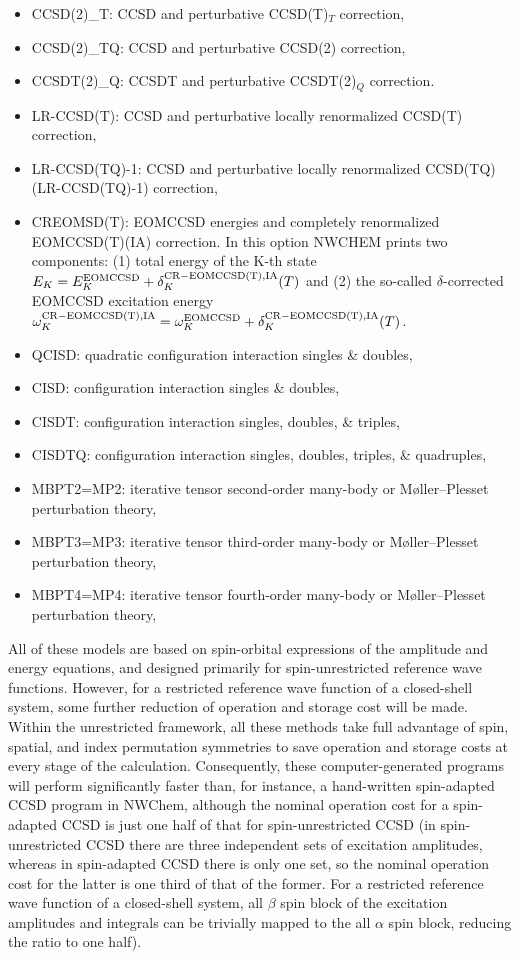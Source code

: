 \begin{itemize}
\item CCSD(2)\_T: CCSD and perturbative CCSD(T)$_T$ correction,
\item CCSD(2)\_TQ: CCSD and  perturbative CCSD(2) correction,
\item CCSDT(2)\_Q: CCSDT and perturbative CCSDT(2)$_Q$ correction.
\item LR-CCSD(T): CCSD and perturbative locally renormalized CCSD(T) correction,
\item LR-CCSD(TQ)-1: CCSD and perturbative locally renormalized CCSD(TQ) (LR-CCSD(TQ)-1) correction,
\item CREOMSD(T): EOMCCSD energies and completely renormalized EOMCCSD(T)(IA) correction.
In this option NWCHEM prints two components: (1) total energy of the K-th state 
$E_K=E_K^{\rm EOMCCSD}+\delta_K^{\rm CR-EOMCCSD(T),IA}(T)$ and (2)
the so-called $\delta$-corrected EOMCCSD excitation energy
$\omega_K^{\rm CR-EOMCCSD(T),IA}=\omega_K^{\rm EOMCCSD}+\delta_K^{\rm CR-EOMCCSD(T),IA}(T)$.
\item QCISD: quadratic configuration interaction singles \& doubles,
\item CISD: configuration interaction singles \& doubles,
\item CISDT: configuration interaction singles, doubles, \& triples,
\item CISDTQ: configuration interaction singles, doubles, triples, \& quadruples,
\item MBPT2=MP2: iterative tensor second-order many-body or M\o ller--Plesset perturbation theory,
\item MBPT3=MP3: iterative tensor third-order many-body or M\o ller--Plesset perturbation theory,
\item MBPT4=MP4: iterative tensor fourth-order many-body or M\o ller--Plesset perturbation theory,
\end{itemize}

All of these models are based on spin-orbital expressions of the amplitude and energy equations, 
and designed primarily for spin-unrestricted reference wave functions.  However, for a restricted 
reference wave function of a closed-shell system, some further reduction of operation and storage
cost will be made.  Within the unrestricted framework, all these methods take full advantage
of spin, spatial, and index permutation symmetries to save operation and storage costs at every
stage of the calculation.  Consequently, these computer-generated programs will perform significantly
faster than, for instance, a hand-written spin-adapted CCSD program in NWChem, although the nominal 
operation cost for a spin-adapted CCSD is just one half of that for spin-unrestricted CCSD (in spin-unrestricted
CCSD there are three independent sets of excitation amplitudes, whereas in spin-adapted CCSD there
is only one set, so the nominal operation cost for the latter is one third of that of the former.  For 
a restricted reference wave function of a closed-shell system, all $\beta$ spin block of the excitation
amplitudes and integrals can be trivially mapped to the all $\alpha$ spin block, reducing the ratio
to one half).

